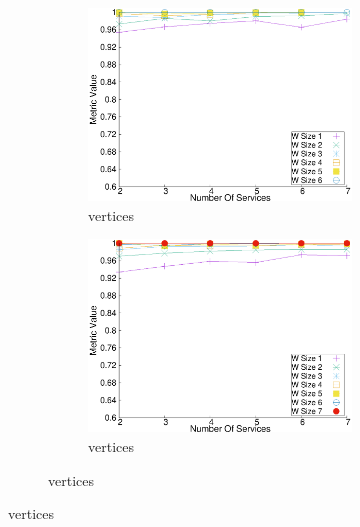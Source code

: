 \begin{figure}[H]
\begin{adjustbox}{minipage=\linewidth,scale=0.75}
\begin{subfigure}{0.45\textwidth}
        \begin{subfigure}{\textwidth}
          \includegraphics[width=\textwidth]{Images/graphs/window_quality_performance_diff_qual_n7_s7_50_80_n6}
          \caption{ vertices}
          \label{fig:quality_window_average_qualitative_n6}
        \end{subfigure}


        \begin{subfigure}{\textwidth}
          \includegraphics[width=\textwidth]{Images/graphs/window_quality_performance_diff_qual_n7_s7_50_80_n7}
          \caption{ vertices}
          \label{fig:quality_window_average_qualitative_n7}
        \end{subfigure}


\end{subfigure}
\end{adjustbox}
\end{figure}
